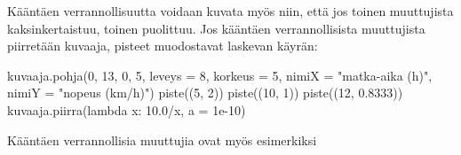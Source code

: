 Kääntäen verrannollisuutta voidaan kuvata myös niin, että jos toinen muuttujista kaksinkertaistuu, toinen puolittuu. Jos kääntäen verrannollisista muuttujista piirretään kuvaaja, pisteet muodostavat laskevan käyrän:

\begin{center}
\begin{kuva}
    kuvaaja.pohja(0, 13, 0, 5, leveys = 8, korkeus = 5, nimiX = "matka-aika (h)", nimiY = "nopeus (km/h)")
    piste((5, 2))
    piste((10, 1))
    piste((12, 0.8333))
    kuvaaja.piirra(lambda x: 10.0/x, a = 1e-10)
\end{kuva}
\end{center}

\begin{esimerkki}
Kääntäen verrannollisia muuttujia ovat myös esimerkiksi
\end{esimerkki}